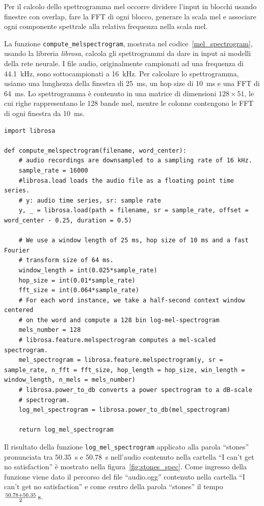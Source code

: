 \documentclass[12pt,a4paper,titlepage]{article}
\begin{document}
Per il calcolo dello spettrogramma mel occorre dividere l'input in blocchi usando finestre con overlap, fare la FFT di ogni blocco, generare la scala mel e associare ogni componente spettrale alla relativa frequenza nella scala mel.    

La funzione \texttt{compute\_melspectrogram}, mostrata nel codice~\ref{mel_spectrogram}, usando la libreria \emph{librosa}, calcola gli spettrogrammi da dare in input ai modelli della rete neurale. I file audio, originalmente campionati ad una frequenza di \SI{44.1}{\kilo \hertz}, sono sottocampionati a \SI{16}{\kilo \hertz}. Per calcolare lo spettrogramma, usiamo una lunghezza della finestra di \SI{25}{\milli \second}, un hop size di \SI{10}{\milli \second} e una FFT di \SI{64}{\milli \second}. Lo spettrogramma è contenuto in una matrice di dimensioni $128 \times 51$, le cui righe rappresentano le 128 bande mel, mentre le colonne contengono le FFT di ogni finestra da \SI{10}{\milli \second}.

\begin{lstlisting}[language=iPython,firstnumber=1, caption=mel\_spectrogram.py, label=mel_spectrogram,captionpos=b]
import librosa

def compute_melspectrogram(filename, word_center):
    # audio recordings are downsampled to a sampling rate of 16 kHz.
    sample_rate = 16000
    #librosa.load loads the audio file as a floating point time series.
    # y: audio time series, sr: sample rate
    y, _ = librosa.load(path = filename, sr = sample_rate, offset = word_center - 0.25, duration = 0.5)

    # We use a window length of 25 ms, hop size of 10 ms and a fast Fourier
    # transform size of 64 ms.
    window_length = int(0.025*sample_rate)
    hop_size = int(0.01*sample_rate)
    fft_size = int(0.064*sample_rate)
    # For each word instance, we take a half-second context window centered
    # on the word and compute a 128 bin log-mel-spectrogram
    mels_number = 128
    # librosa.feature.melspectrogram computes a mel-scaled spectrogram.
    mel_spectrogram = librosa.feature.melspectrogram(y, sr = sample_rate, n_fft = fft_size, hop_length = hop_size, win_length = window_length, n_mels = mels_number)
    # librosa.power_to_db converts a power spectrogram to a dB-scale
    # spectrogram.
    log_mel_spectrogram = librosa.power_to_db(mel_spectrogram)
    
    return log_mel_spectrogram
\end{lstlisting}

Il risultato della funzione \texttt{log\_mel\_spectrogram} applicato alla parola ``stones'' pronunciata tra \SI{50.35}{\second} e \SI{50.78}{\second} nell'audio contenuto nella cartella ``I can't get no satisfaction'' è mostrato nella figura~\ref{fig:stones_spec}. Come ingresso della funzione viene dato il percorso del file ``audio.ogg'' contenuto nella cartella ``I can't get no satisfaction'' e come centro della parola ``stones'' il tempo $\SI[parse-numbers=false]{\frac{50.78 + 50.35}{2}}{\second}$.
\end{document}
